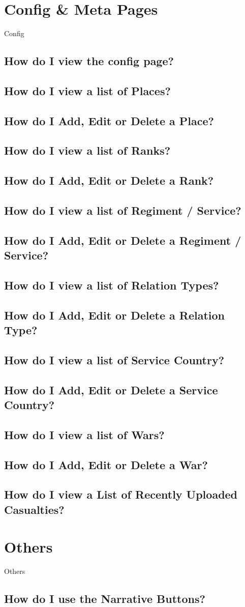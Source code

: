 \documentclass[12pt]{article}
\begin{document}
\section{Config \& Meta Pages}\label{sec:config}
Config
\subsection{How do I view the config page?}
\subsection{How do I view a list of Places?}
\subsection{How do I Add, Edit or Delete a Place?}
\subsection{How do I view a list of Ranks?}
\subsection{How do I Add, Edit or Delete a Rank?}
\subsection{How do I view a list of Regiment / Service?}
\subsection{How do I Add, Edit or Delete a Regiment / Service?}
\subsection{How do I view a list of Relation Types?}
\subsection{How do I Add, Edit or Delete a Relation Type?}
\subsection{How do I view a list of Service Country?}
\subsection{How do I Add, Edit or Delete a Service Country?}
\subsection{How do I view a list of Wars?}
\subsection{How do I Add, Edit or Delete a War?}
\subsection{How do I view a List of Recently Uploaded Casualties?}

\section{Others}
Others
\subsection{How do I use the Narrative Buttons?}
\end{document}
